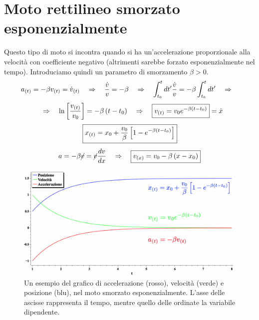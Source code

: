 \section{Moto rettilineo smorzato esponenzialmente}
Questo tipo di moto si incontra quando si ha un'accelerazione proporzionale
alla velocità con coefficiente negativo (altrimenti sarebbe forzato esponenzialmente nel tempo). Introduciamo quindi un parametro di smorzamento $\beta>0$.
\begin{equation*}
    a_{(t)} = -\beta v_{(t)} = \dot v_{(t)}\quad\Rightarrow\quad \frac{\dot v}{v} =
    -\beta \quad\Rightarrow\quad \int_{t_0}^{t}dt' \frac{\dot v}{v} =  -\beta\int_{t_0}^{t}dt'\quad\Rightarrow\quad
\end{equation*}
\begin{equation}
    \quad\Rightarrow\quad\ln{\left[ \frac{v_{(t)}}{v_0}\right]} =
    -\beta\left( t-t_0\right)\quad\Rightarrow\quad \boxed{v_{(t)} = v_0e^{-\beta\left( t-t_0\right)}} = \dot x 
\end{equation}
\begin{equation}
    \boxed{x_{(t)} = x_0 + \frac{v_0}\beta\left[1-e^{-\beta\left( t-t_0\right)}\right]}
\label{eq:MRSE}
\end{equation}
\begin{equation}
    a = -\beta \cancel{v} = \cancel{v}\frac{dv}{dx}\quad\Rightarrow\quad
    \boxed{v_{(x)} = v_0 - \beta\left( x - x_0\right)}
\label{eq:v(x)_MRSE}
\end{equation}

\begin{figure}[htbp]
    \begin{center}
        \includegraphics[width=13cm]{images/Motosmorz1.png} 
        \caption{Un esempio del grafico di accelerazione (rosso), velocità (verde)
        e posizione (blu), nel moto smorzato esponenzialmente. L'asse delle
        ascisse rappresenta il tempo, mentre quello delle ordinate
        la variabile dipendente.}
    \end{center}
\label{fig:MRSE}
\end{figure}